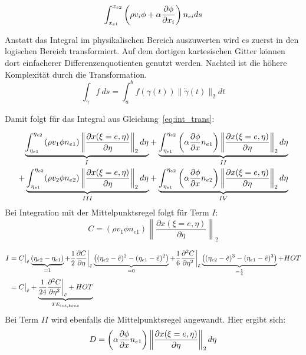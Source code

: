 \begin{equation}
  \int_{x_{e1}}^{x_{e2}}\left({\rho v_i\phi+\alpha \pder[\phi]{x_i}}\right)n_{ei}ds
  \label{eq:int_trans}
\end{equation}

Anstatt das Integral im physikalischen Bereich auszuwerten wird es zuerst in den
logischen Bereich transformiert. Auf dem dortigen kartesischen Gitter können dort einfacherer
Differenzenquotienten genutzt werden. Nachteil ist die höhere Komplexität durch
die Transformation.
\begin{equation}
  \int_{\gamma}f\ ds=\int_a^bf(\gamma (t)) \lVert \dot{\gamma}(t)\rVert_2 dt
\end{equation}

Damit folgt für das Integral aus Gleichung~\eqref{eq:int_trans}:

\begin{align*}
  \underbrace{
    \int_{\eta_{e1}}^{\eta_{e2}} \left({\rho v_1 \phi n_{e1}}\right)
  \left\lVert \frac{\partial x(\xi=e, \eta)}{\partial \eta} \right\rVert_2 d\eta
  }_I
  &+ \underbrace{
  \int_{\eta_{e1}}^{\eta_{e2}} \left({\alpha \pder[\phi]{x} n_{e1}}\right)
  \left\lVert \frac{\partial x(\xi=e, \eta)}{\partial \eta} \right\rVert_2 d\eta
}_{II}\\
  + \underbrace{
  \int_{\eta_{e1}}^{\eta_{e2}} (\rho v_2 \phi n_{e2})
  \left\lVert \frac{\partial x(\xi=e, \eta)}{\partial \eta} \right\rVert_2 d\eta
  }_{III}
  &+ \underbrace{
  \int_{\eta_{e1}}^{\eta_{e2}} \left({\alpha \pder[\phi]{x} n_{e2}}\right)
  \left\lVert \frac{\partial x(\xi=e, \eta)}{\partial \eta} \right\rVert_2 d\eta
  }_{IV}
\end{align*}
Bei Integration mit der Mittelpunktsregel folgt für Term $I$:
\begin{equation*}
  C=(\rho v_1 \phi n_{e1})
  \left\lVert \frac{\partial x(\xi=e, \eta)}{\partial \eta} \right\rVert_2
\end{equation*}

\begin{align*}
  I&= C\big\vert_{\tilde{e}} \underbrace{(\etaii-\etai)}_{=1} + \frac{1}{2} \pder[C]{\eta}\bigg\vert_{\tilde{e}}
  \underbrace{\left({(\etaii-\etilde)^2-(\etai-\etilde)^2}\right)}_{=0}
  +\frac{1}{6} \frac{\partial^2 C}{\partial \eta^2}\bigg\vert_{\tilde{e}}
  \underbrace{\left({(\etaii-\etilde)^3-(\etai-\etilde)^3}\right)}_{=\frac{1}{4}} + HOT\\
  &= C \big\vert_{\tilde{e}}+ \underbrace{\frac{1}{24}  \frac{\partial^2 C}{\partial \eta^2}
\bigg\vert_{\tilde{e}}+HOT}_{TE_{int,konv}}
\end{align*}
Bei Term $II$ wird ebenfalls die Mittelpunktsregel angewandt. Hier ergibt sich:
\begin{equation*}
  D=  \left({\alpha \pder[\phi]{x} n_{e1}}\right)
  \left\lVert \frac{\partial x(\xi=e, \eta)}{\partial \eta} \right\rVert_2 d\eta
\end{equation*}

